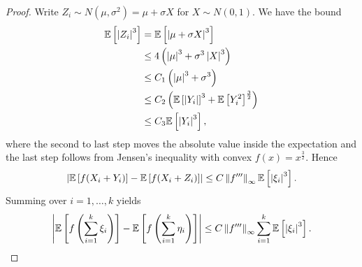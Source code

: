 \begin{proof}
	Write $Z_i \sim N(\mu,\sigma^2) = \mu + \sigma X$ for $X \sim N(0,1)$. We have the bound
	\begin{align*}
		\mathbb{E}\left[\left| Z_i \right|^3\right] &= \mathbb{E}\left[\left| \mu + \sigma X \right|^3\right] \\
											&\le 4\left( \left| \mu \right|^3 + \sigma^3 \left| X \right|^3 \right) \\
											&\le C_1 \left( \left|\mu\right|^3 + \sigma^3 \right) \\
		&\le C_2\left( \mathbb{E}\left[\left| Y_i \right|\right] ^3 + \mathbb{E}\left[Y_i^2\right]^{\frac{3}{2}} \right) \\
		&\le C_3 \mathbb{E}\left[\left| Y_i \right|^3\right],
	\end{align*}
	where the second to last step moves the absolute value inside the expectation and the last step follows from Jensen's inequality with convex $f(x) = x^{\frac{3}{2}}$. Hence
	\[
		\left| \mathbb{E}\left[f(X_i + Y_i)\right] - \mathbb{E}\left[f(X_i + Z_i)\right] \right|
		\le C \left\|f'''\right\|_\infty \mathbb{E}\left[\left| \xi_i \right|^3\right].
	\]
	Summing over $i=1,\ldots,k$ yields
	\[
		\left| \mathbb{E}\left[f\left( \sum\limits_{i=1}^{k} \xi_i \right)\right] - \mathbb{E}\left[f\left( \sum\limits_{i=1}^{k} \eta_i \right)\right] \right|
		\le C \left\|f'''\right\|_\infty \sum\limits_{i=1}^{k} \mathbb{E}\left[\left| \xi_i \right|^3\right].
	\]
\end{proof}

